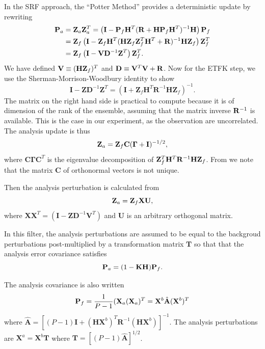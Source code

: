 \documentclass[12pt]{report}
\begin{document}
In the SRF approach, the ``Potter Method'' provides a deterministic update by rewriting
\begin{align} \mathbf{P}_a &= \mathbf{Z}_a \mathbf{Z}_a^T = \left(\mathbf{I}-\mathbf{P}_f\mathbf{H}^T(\mathbf{R}+\mathbf{H}\mathbf{P}_f\mathbf{H}^T)^{-1}\mathbf{H}\right)\mathbf{P}_f \\
&= \mathbf{Z}_f\left(\mathbf{I}-\mathbf{Z}_f\mathbf{H}^T(\mathbf{H}\mathbf{Z}_f\mathbf{Z}_f^T\mathbf{H}^T+\mathbf{R})^{-1}\mathbf{H}\mathbf{Z}_f\right)\mathbf{Z}_f^T\\
&= \mathbf{Z}_f\left(\mathbf{I}-\mathbf{V}\mathbf{D}^{-1}\mathbf{Z}^T\right)\mathbf{Z}_f^T. \end{align}
We have defined $\mathbf{V}\equiv(\mathbf{H}\mathbf{Z}_f)^T$ and $\mathbf{D}\equiv\mathbf{V}^T\mathbf{V}+\mathbf{R}$.
Now for the ETFK step, we use the Sherman-Morrison-Woodbury identity to show
\begin{equation} \mathbf{I} - \mathbf{Z}\mathbf{D}^{-1}\mathbf{Z}^T = (\mathbf{I}+\mathbf{Z}_f\mathbf{H}^T\mathbf{R}^{-1}\mathbf{H}\mathbf{Z}_f)^{-1}.\end{equation}
The matrix on the right hand side is practical to compute because it is of dimension of the rank of the ensemble, assuming that the matrix inverse $\mathbf{R}^{-1}$ is available.
This is the case in our experiment, as the observation are uncorrelated.
The analysis update is thus
\begin{equation} \mathbf{Z}_a = \mathbf{Z}_f \mathbf{C}(\mathbf{\Gamma} +\mathbf{I})^{-1/2} ,\end{equation}
where $\mathbf{C}\mathbf{\Gamma}\mathbf{C}^T$ is the eigenvalue decomposition of $\mathbf{Z}_f^T\mathbf{H}^T\mathbf{R}^{-1}\mathbf{H}\mathbf{Z}_f$.
From  we note that the matrix $\mathbf{C}$ of orthonormal vectors is not unique.

Then the analysis perturbation is calculated from
\begin{equation} \mathbf{Z}_a = \mathbf{Z}_f \mathbf{X} \mathbf{U}, \end{equation}
where $\mathbf{X}\mathbf{X}^T = (\mathbf{I}-\mathbf{Z}\mathbf{D}^{-1}\mathbf{V}^T)$ and $\mathbf{U}$ is an arbitrary orthogonal matrix.

In this filter, the analysis perturbations are assumed to be equal to the backgroud perturbations post-multiplied by a transformation matrix $\mathbf{T}$ so that that the analysis error covariance satisfies
$$ \mathbf{P}_a = (1- \mathbf{K} \mathbf{H} ) \mathbf{P}_f .$$

The analysis covariance is also written
$$ \mathbf{P}_f = \frac{1}{P-1} ( \mathbf{X}_a (\mathbf{X}_a) ^T = \mathbf{X} ^b \hat{\mathbf{A}} (\mathbf{X} ^b) ^T $$
where $\hat{\mathbf{A}} = [(P-1) \mathbf{I} + (\mathbf{H} \mathbf{X} ^b ) ^T \mathbf{R} ^{-1} (\mathbf{H} \mathbf{X} ^b ) ] ^{-1} $.
The analysis perturbations are $\mathbf{X} ^a = \mathbf{X} ^b \mathbf{T}$ where $\mathbf{T} = [(P-1)\hat{\mathbf{A}} ] ^{1/2} $.
\end{document}
